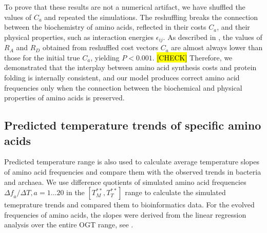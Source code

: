 \documentclass[10pt,letterpaper]{article}
\begin{document}
To prove that these results are not a numerical artifact, we have shuffled the values of $C_a$ and repeated the simulations. The reshuffling breaks the connection between the biochemistry of amino acids, reflected in their costs $C_a$, and their physical properties, such as interaction energies $\epsilon_{ij}$. As described in , the values of $R_A$ and $R_D$ obtained from reshuffled cost vectors $C_a$ are almost always lower than those for the initial true $C_a$, yielding $P<0.001$. \hl{[CHECK]} Therefore, we demonstrated that the interplay between amino acid synthesis costs and protein folding is internally consistent, and our model produces correct amino acid frequencies only when the connection between the biochemical and physical properties of amino acids is preserved.

 

\subsection*{Predicted temperature trends of specific amino acids}
    
Predicted temperature range is also used to calculate average temperature slopes of amino acid frequencies and compare them with the observed trends in bacteria and archaea. We use difference quotients of simulated amino acid frequencies $\Delta\mathit{f}_{a}/\Delta T, a=1\dots20$ in the $[T^{**}_M,T^{**}_T]$ range to calculate the simulated temeprature trends and compared them to bioinformatics data. For the evolved frequencies of amino acids, the slopes were derived from the  linear regression analysis over the entire OGT range, see .
\end{document}
